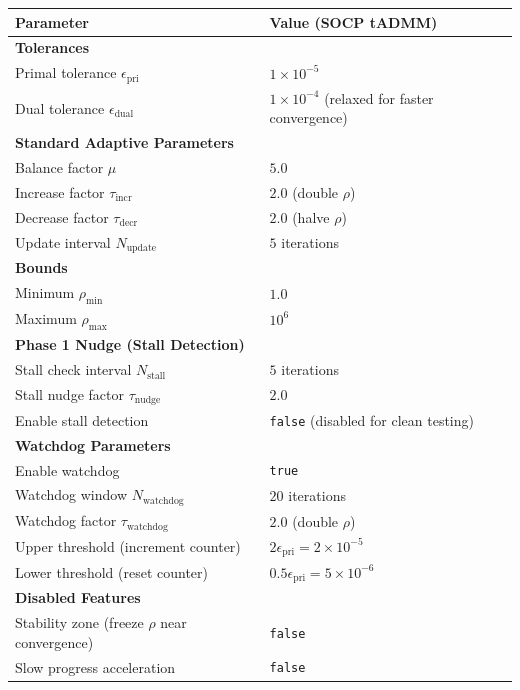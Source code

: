 \documentclass[11pt]{article}
\begin{document}
\begin{center}
\begin{tabular}{ll}
\toprule
\textbf{Parameter} & \textbf{Value (SOCP tADMM)} \\
\midrule
\textbf{Tolerances} & \\
Primal tolerance $\epsilon_{\text{pri}}$ & $1 \times 10^{-5}$ \\
Dual tolerance $\epsilon_{\text{dual}}$ & $1 \times 10^{-4}$ (relaxed for faster convergence) \\
\midrule
\textbf{Standard Adaptive Parameters} & \\
Balance factor $\mu$ & $5.0$ \\
Increase factor $\tau_{\text{incr}}$ & $2.0$ (double $\rho$) \\
Decrease factor $\tau_{\text{decr}}$ & $2.0$ (halve $\rho$) \\
Update interval $N_{\text{update}}$ & $5$ iterations \\
\midrule
\textbf{Bounds} & \\
Minimum $\rho_{\min}$ & $1.0$ \\
Maximum $\rho_{\max}$ & $10^6$ \\
\midrule
\textbf{Phase 1 Nudge (Stall Detection)} & \\
Stall check interval $N_{\text{stall}}$ & $5$ iterations \\
Stall nudge factor $\tau_{\text{nudge}}$ & $2.0$ \\
Enable stall detection & \texttt{false} (disabled for clean testing) \\
\midrule
\textbf{Watchdog Parameters} & \\
Enable watchdog & \texttt{true} \\
Watchdog window $N_{\text{watchdog}}$ & $20$ iterations \\
Watchdog factor $\tau_{\text{watchdog}}$ & $2.0$ (double $\rho$) \\
Upper threshold (increment counter) & $2\epsilon_{\text{pri}} = 2 \times 10^{-5}$ \\
Lower threshold (reset counter) & $0.5\epsilon_{\text{pri}} = 5 \times 10^{-6}$ \\
\midrule
\textbf{Disabled Features} & \\
Stability zone (freeze $\rho$ near convergence) & \texttt{false} \\
Slow progress acceleration & \texttt{false} \\
\bottomrule
\end{tabular}
\end{center}
\end{document}
